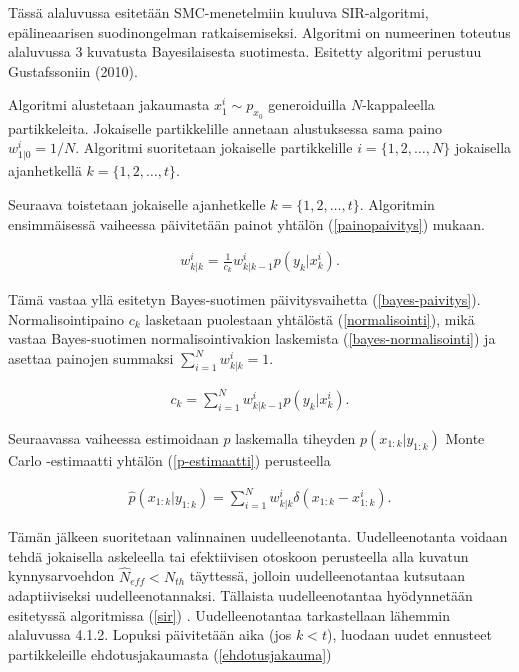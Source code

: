 \documentclass[
  12pt,
  a4paper, twoside]{book}
\begin{document}
Tässä alaluvussa esitetään SMC-menetelmiin kuuluva SIR-algoritmi, epälineaarisen suodinongelman ratkaisemiseksi. Algoritmi on numeerinen toteutus alaluvussa 3 kuvatusta Bayesilaisesta suotimesta. Esitetty algoritmi perustuu Gustafssoniin (2010).

Algoritmi alustetaan jakaumasta \(x_1^i\sim p_{x_0}\) generoiduilla \(N\)-kappaleella partikkeleita. Jokaiselle partikkelille annetaan alustuksessa sama paino \(w_{1|0}^i=1/N\). Algoritmi suoritetaan jokaiselle partikkelille \(i=\{1,2,\ldots,N\}\) jokaisella ajanhetkellä \(k=\{1,2,\ldots,t\}\).

Seuraava toistetaan jokaiselle ajanhetkelle \(k=\{1,2,\ldots,t\}\). Algoritmin ensimmäisessä vaiheessa päivitetään painot yhtälön (\ref{painopaivitys}) mukaan.

\begin{align}\label{painopaivitys}
w^i_{k|k}=\frac{1}{c_k}w^i_{k|k-1}p(y_k|x^i_k).
\end{align}

\noindent Tämä vastaa yllä esitetyn Bayes-suotimen päivitysvaihetta (\ref{bayes-paivitys}). Normalisointipaino \(c_k\) lasketaan puolestaan yhtälöstä (\ref{normalisointi}), mikä vastaa Bayes-suotimen normalisointivakion laskemista (\ref{bayes-normalisointi}) ja asettaa painojen summaksi \(\sum_{i=1}^Nw^i_{k|k}=1\).

\begin{align}\label{normalisointi}
c_k=\sum_{i=1}^{N}w_{k|{k-1}}^ip(y_k|x_k^i).
\end{align}

\noindent Seuraavassa vaiheessa estimoidaan \(p\) laskemalla tiheyden \(p(x_{1:k}|y_{1:k})\) Monte Carlo -estimaatti yhtälön (\ref{p-estimaatti}) perusteella

\begin{align}\label{p-estimaatti}
\hat{p}(x_{1:k}|y_{1:k})=\sum_{i=1}^{N}w_{k|k}^i \delta(x_{1:k}-x_{1:k}^i).
\end{align}

Tämän jälkeen suoritetaan valinnainen uudelleenotanta. Uudelleenotanta voidaan tehdä jokaisella askeleella tai efektiivisen otoskoon perusteella alla kuvatun kynnysarvoehdon \(\hat{N}_{eff}< N_{th}\) täyttessä, jolloin uudelleenotantaa kutsutaan adaptiiviseksi uudelleenotannaksi. Tällaista uudelleenotantaa hyödynnetään esitetyssä algoritmissa (\ref{sir}) . Uudelleenotantaa tarkastellaan lähemmin alaluvussa 4.1.2.
Lopuksi päivitetään aika (jos \(k < t\)), luodaan uudet ennusteet partikkeleille ehdotusjakaumasta (\ref{ehdotusjakauma})
\end{document}
